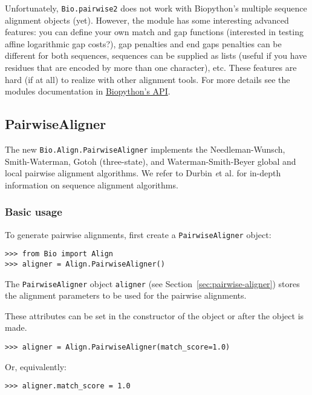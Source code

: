 Unfortunately, \verb|Bio.pairwise2| does not work with Biopython's multiple
sequence alignment objects (yet).
However, the module has some interesting advanced features: you can
define your own match and gap functions (interested in testing affine
logarithmic gap costs?), gap penalties and end gaps penalties can be different
for both sequences, sequences can be supplied as lists (useful if you have
residues that are encoded by more than one character), etc. These features
are hard (if at all) to realize with other alignment tools. For more details
see the modules documentation in
\href{http://biopython.org/docs/\bpversion/api/Bio.pairwise2.html}{Biopython's API}.

\subsection{PairwiseAligner}
\label{sec:pairwisealigner}
The new \verb|Bio.Align.PairwiseAligner| implements the Needleman-Wunsch, Smith-Waterman,
Gotoh (three-state), and Waterman-Smith-Beyer global and local pairwise alignment algorithms.
We refer to Durbin {\textit et al.} \cite{durbin1998} for in-depth information on sequence alignment algorithms.

\subsubsection{Basic usage}
\label{sec:pairwise-basic}

To generate pairwise alignments, first create a \verb+PairwiseAligner+ object:

\begin{verbatim}
>>> from Bio import Align
>>> aligner = Align.PairwiseAligner()
\end{verbatim}
The \verb+PairwiseAligner+ object \verb+aligner+
(see Section~\ref{sec:pairwise-aligner})
stores the alignment parameters to be used for the pairwise alignments.

These attributes can be set in the constructor of the object or after the object
is made.

\begin{verbatim}
>>> aligner = Align.PairwiseAligner(match_score=1.0)
\end{verbatim}

Or, equivalently:

\begin{verbatim}
>>> aligner.match_score = 1.0
\end{verbatim}

